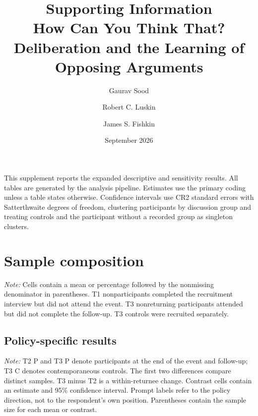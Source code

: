 \documentclass{article}
\title{Supporting Information\\How Can You Think That? Deliberation and the Learning of Opposing Arguments}
\author{Gaurav Sood \and Robert C. Luskin \and James S. Fishkin}
\date{September 2026}
\begin{document}
\maketitle

This supplement reports the expanded descriptive and sensitivity results. All tables are
generated by the analysis pipeline. Estimates use the primary coding unless a table states
otherwise. Confidence intervals use CR2 standard errors with Satterthwaite degrees of freedom,
clustering participants by discussion group and treating controls and the participant without a
recorded group as singleton clusters.

\section{Sample composition}

\begin{table}[H]
\centering
\caption{Composition of recruitment, participant, returnee, and control samples}

\begin{minipage}{0.95\textwidth}
\smallskip\footnotesize
\textit{Note:} Cells contain a mean or percentage followed by the nonmissing denominator in
parentheses. T1 nonparticipants completed the recruitment interview but did not attend the
event. T3 nonreturning participants attended but did not complete the follow-up. T3 controls
were recruited separately.
\end{minipage}
\end{table}

\clearpage
\begin{landscape}
\section{Policy-specific results}

\begin{table}[H]
\centering
\scriptsize
\caption{Mean coded reasons and contrasts by policy and prompt}
\resizebox{\linewidth}{!}{%

}
\begin{minipage}{0.96\linewidth}
\smallskip\footnotesize
\textit{Note:} T2 P and T3 P denote participants at the end of the event and follow-up; T3 C
denotes contemporaneous controls. The first two differences compare distinct samples. T3
minus T2 is a within-returnee change. Contrast cells contain an estimate and 95\% confidence
interval. Prompt labels refer to the policy direction, not to the respondent's own position.
Parentheses contain the sample size for each mean or contrast.
\end{minipage}
\end{table}
\end{landscape}
\end{document}
